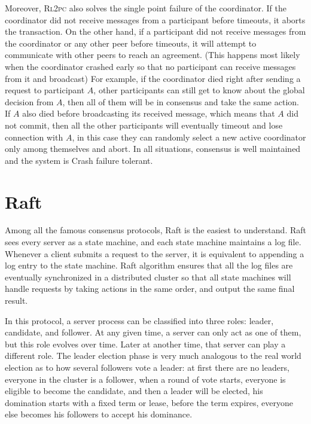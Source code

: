 \documentclass[11pt]{article}
\begin{document}
    Moreover, \textsc{Rl2pc} also solves the single point failure of the coordinator. If the coordinator did not receive messages from a participant before timeouts, it aborts the transaction. On the other hand, if a participant did not receive messages from the coordinator or any other peer before timeouts, it will attempt to communicate with other peers to reach an agreement. (This happens most likely when the coordinator crashed early so that no participant can receive messages from it and broadcast) For example, if the coordinator died right after sending a request to participant $A$, other participants can still get to know about the global decision from $A$, then all of them will be in consensus and take the same action. If $A$ also died before broadcasting its received message, which means that $A$ did not commit, then all the other participants will eventually timeout and lose connection with $A$, in this case they can randomly select a new active coordinator only among themselves and abort. In all situations, consensus is well maintained and the system is Crash failure tolerant.

  \section{Raft}
    Among all the famous consensus protocols, Raft\autocite{raft} is the easiest to understand. Raft sees every server as a state machine, and each state machine maintains a log file. Whenever a client submits a request to the server, it is equivalent to appending a log entry to the state machine. Raft algorithm ensures that all the log files are eventually synchronized in a distributed cluster so that all state machines will handle requests by taking actions in the same order, and output the same final result.

    In this protocol, a server process can be classified into three roles: leader, candidate, and follower. At any given time, a server can only act as one of them, but this role evolves over time. Later at another time, that server can play a different role. The leader election phase is very much analogous to the real world election as to how several followers vote a leader: at first there are no leaders, everyone in the cluster is a follower, when a round of vote starts, everyone is eligible to become the candidate, and then a leader will be elected, his domination starts with a fixed term or lease, before the term expires, everyone else becomes his followers to accept his dominance.
\end{document}
